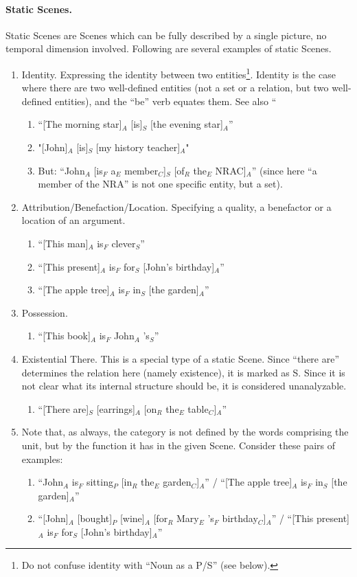 \documentclass[11pt]{article}
\newcommand{\be}{\begin{enumerate}}
\newcommand{\ee}{\end{enumerate}}
\begin{document}
\paragraph{Static Scenes.} Static Scenes are Scenes which can be fully described by a single picture, no temporal dimension involved. Following are several examples of static Scenes.
\be
\item
Identity. Expressing the identity between two entities\footnote{Do not confuse identity with ``Noun as a P/S'' (see below).}. Identity is the case where there are two well-defined entities (not a set or a relation, but two well-defined entities), and the ``be'' verb equates them. See also ``
\be
\item
``[The morning star]$_A$ [is]$_S$ [the evening star]$_A$''
\item
"[John]$_A$ [is]$_S$ [my history teacher]$_A$"
\item
But: ``John$_A$ [is$_F$ a$_E$ member$_C$]$_S$ [of$_R$ the$_E$ NRAC]$_A$'' (since here ``a member of the NRA'' is not one specific entity, but a set).
\ee

\item
Attribution/Benefaction/Location. Specifying a quality, a benefactor or a location of an argument.
\be
\item
``[This man]$_A$ is$_F$ clever$_S$''
\item
``[This present]$_A$ is$_F$ for$_S$ [John's birthday]$_A$''
\item
``[The apple tree]$_A$ is$_F$ in$_S$ [the garden]$_A$''
\ee

\item
Possession.
\be
\item
``[This book]$_A$ is$_F$ John$_A$ 's$_S$''
\ee
\item
Existential There. This is a special type of a static Scene. Since ``there are'' determines the relation here (namely existence), it is marked as S. Since it is not clear what its internal structure should be, it is considered unanalyzable.
\be
\item
``[There are]$_S$ [earrings]$_A$ [on$_R$ the$_E$ table$_C$]$_A$''
\ee

\item
Note that, as always, the category is not defined by the words comprising the unit, but by the function it has in the given Scene. Consider these pairs of examples:
\be
\item
``John$_A$ is$_F$ sitting$_P$ [in$_R$ the$_E$ garden$_C$]$_A$'' / ``[The apple tree]$_A$ is$_F$ in$_S$ [the garden]$_A$''
\item
``[John]$_A$ [bought]$_P$ [wine]$_A$ [for$_R$ Mary$_E$ 's$_F$ birthday$_C$]$_A$'' / ``[This present]$_A$ is$_F$ for$_S$ [John's birthday]$_A$''
\ee
\ee
\end{document}
